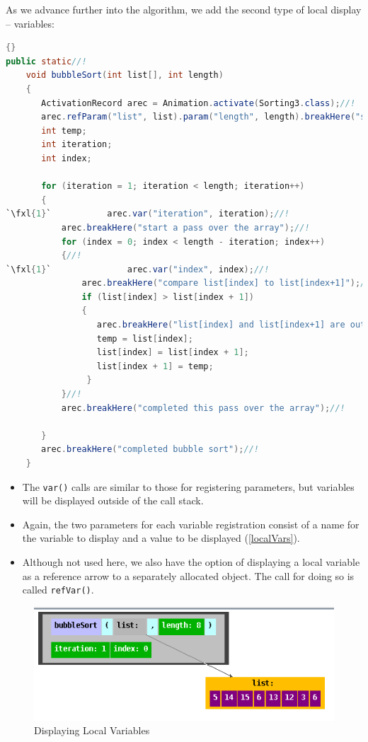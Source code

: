 \documentclass[11pt,titlepage]{book}
\def\fxl#1{%
\newdimen\fxlheight\setlength{\fxlheight}{#1\baselineskip}%
\advance\fxlheight by -0.5\baselineskip%
\begin{picture}(0,0)%
\setlength{\unitlength}{\baselineskip}%
\put(0,0){\makebox(0,0.75)[tl]{%
\colorbox{paleyellow}{%
\rule{0pt}{\fxlheight}%
\rule{\linewidth}{0pt}}%
}}\end{picture}%
}
\begin{document}
As we advance further into the algorithm, we add the second type of
local display -- variables:
\begin{lstlisting}[language=Java,frame=tb]{}
public static//!
    void bubbleSort(int list[], int length)
    {
       ActivationRecord arec = Animation.activate(Sorting3.class);//!
       arec.refParam("list", list).param("length", length).breakHere("starting bubble sort");//!
       int temp;
       int iteration;
       int index;

       for (iteration = 1; iteration < length; iteration++)
       {
`\fxl{1}`           arec.var("iteration", iteration);//!
           arec.breakHere("start a pass over the array");//!
           for (index = 0; index < length - iteration; index++)
           {//!
`\fxl{1}`               arec.var("index", index);//!
               arec.breakHere("compare list[index] to list[index+1]");//!
               if (list[index] > list[index + 1]) 
               {
                  arec.breakHere("list[index] and list[index+1] are out of order - swap them");//!
                  temp = list[index];
                  list[index] = list[index + 1];
                  list[index + 1] = temp;
                }
           }//!
           arec.breakHere("completed this pass over the array");//!

       }
       arec.breakHere("completed bubble sort");//!
    }
\end{lstlisting}
\begin{itemize}
\item The \texttt{var()} calls are similar to those for registering parameters, but variables will be displayed outside of the call stack.
\item Again, the two parameters for each variable registration consist of a name for the variable to display and a value to be displayed (\autoref{localVars}).
\item Although not used here, we also have the option of displaying a local variable as a reference arrow to a separately allocated object. The call for doing so is called \texttt{refVar()}.
\end{itemize}
\begin{figure}
  \begin{center}
    \includegraphics[scale=0.5]{images/localVars}
  \end{center}
  \caption{Displaying Local Variables}\label{localVars}
  
\end{figure}
\end{document}
